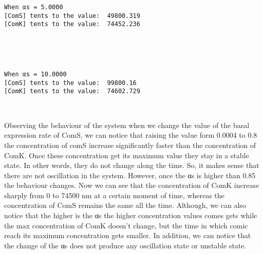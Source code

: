 \documentclass[11pt]{article}
\begin{document}
    \begin{Verbatim}[commandchars=\\\{\}]
When αs = 5.0000
[ComS] tents to the value:  49800.319
[ComK] tents to the value:  74452.236

    \end{Verbatim}

    \begin{center}
    \end{center}
    { \hspace*{\fill} \\}
    
    \begin{center}
    \end{center}
    { \hspace*{\fill} \\}
    
    \begin{Verbatim}[commandchars=\\\{\}]
When αs = 10.0000
[ComS] tents to the value:  99800.16
[ComK] tents to the value:  74602.729

    \end{Verbatim}

    \begin{center}
    \end{center}
    { \hspace*{\fill} \\}
    
    Observing the behaviour of the system when we change the value of the
basal expression rate of ComS, we can notice that raising the value form
0.0004 to 0.8 the concentration of comS increase significantly faster
than the concentration of ComK. Once these concentration get its maximum
value they stay in a stable state. In other words, they do not change
along the time. So, it makes sense that there are not oscillation in the
system. However, once the αs is higher than 0.85 the behaviour changes.
Now we can see that the concentration of ComK increase sharply from 0 to
74500 nm at a certain moment of time, whereas the concentration of ComS
remains the same all the time. Although, we can also notice that the
higher is the αs the higher concentration values comes gets while the
max concentration of ComK doesn't change, but the time in which comic
reach its maximum concentration gets smaller. In addition, we can notice
that the change of the αs does not produce any oscillation state or
unstable state.
\end{document}
